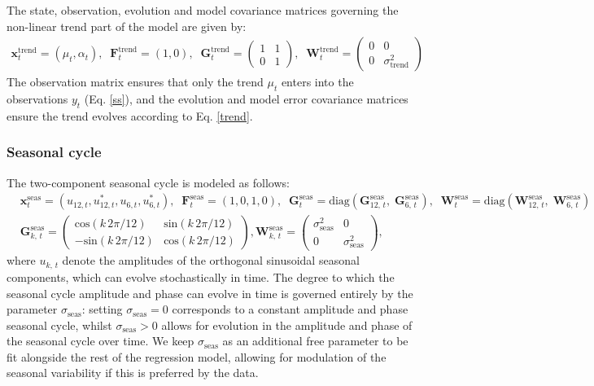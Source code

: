 \documentclass[a4paper, oneside, final]{scrartcl}
\begin{document}
The state, observation, evolution and model covariance matrices governing the non-linear trend part of the model are given by:
\begin{align}
\mathbf{x}^\mathrm{trend}_t=\left(\mu_t, \alpha_t\right),\;\;
\mathbf{F}^\mathrm{trend}_t = \left(1, 0\right),\;\;
\mathbf{G}^\mathrm{trend}_t = \begin{pmatrix} 1 & 1 \\
0 & 1\end{pmatrix},\;\;\mathbf{W}^\mathrm{trend}_t =\begin{pmatrix} 0 & 0 \\
0 & \sigma_\mathrm{trend}^2\end{pmatrix} 
\end{align}
The observation matrix ensures that only the trend $\mu_t$ enters into the observations $y_t$ (Eq. \ref{ss}), and the evolution and model error covariance matrices ensure the trend evolves according to Eq. \ref{trend}.
%
\subsubsection*{Seasonal cycle}
The two-component seasonal cycle is modeled as follows:
\begin{align}
&\mathbf{x}^\mathrm{seas}_t = \left(u_{12,t}, u_{12,t}^*, u_{6,t}, u_{6,t}^*\right),\;\;
\mathbf{F}^\mathrm{seas}_t = \left(1, 0, 1, 0\right),\;\;
\mathbf{G}^\mathrm{seas}_t = \mathrm{diag}\left(\mathbf{G}^\mathrm{seas}_{12,\,t},\;\mathbf{G}^\mathrm{seas}_{6,\,t}\right),\;\;
\mathbf{W}^\mathrm{seas}_t = \mathrm{diag}\left(\mathbf{W}^\mathrm{seas}_{12,\,t},\;\mathbf{W}^\mathrm{seas}_{6,\,t}\right) \nonumber \\
&\mathbf{G}^\mathrm{seas}_{k,\,t} = \begin{pmatrix} \mathrm{cos}(k\,2\pi/12) & \mathrm{sin}(k\,2\pi/12) \\
-\mathrm{sin}(k\,2\pi/12) & \mathrm{cos}(k\,2\pi/12)\end{pmatrix},
\mathbf{W}^\mathrm{seas}_{k,\,t} =\begin{pmatrix} \sigma_\mathrm{seas}^2 & 0 \\
0 & \sigma_\mathrm{seas}^2\end{pmatrix},
\end{align}
where $u_{k,\,t}$ denote the amplitudes of the orthogonal sinusoidal seasonal components, which can evolve stochastically in time. The degree to which the seasonal cycle amplitude and phase can evolve in time is governed entirely by the parameter $\sigma_\mathrm{seas}$: setting $\sigma_\mathrm{seas}=0$ corresponds to a constant amplitude and phase seasonal cycle, whilst $\sigma_\mathrm{seas} >0$ allows for evolution in the amplitude and phase of the seasonal cycle over time. We keep $\sigma_\mathrm{seas}$ as an additional free parameter to be fit alongside the rest of the regression model, allowing for modulation of the seasonal variability if this is preferred by the data.
\end{document}

